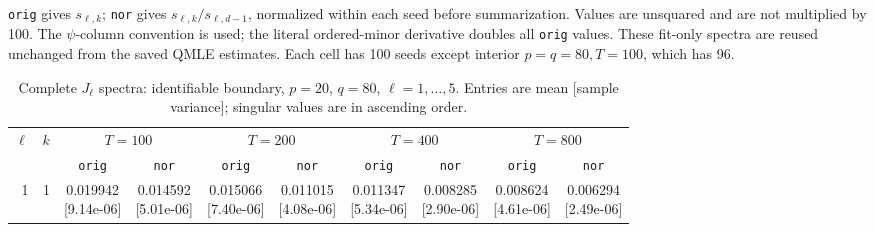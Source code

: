 \documentclass[12pt,letterpaper]{article}
\def\spacingset#1{\renewcommand{\baselinestretch}{#1}\small\normalsize}
\theoremstyle{plain}
\theoremstyle{definition}
\begin{document}
\begin{table}[p]
\begin{adjustbox}{max width=\linewidth}
\begin{tabular}{@{}rr*{8}{c}@{}}
\bottomrule
\end{tabular}
\end{adjustbox}
\par\smallskip
\begin{minipage}{0.98\linewidth}\footnotesize
\texttt{orig} gives $s_{\ell,k}$; \texttt{nor} gives $s_{\ell,k}/s_{\ell,d-1}$, normalized within each seed before summarization. Values are unsquared and are not multiplied by 100. The $\psi$-column convention is used; the literal ordered-minor derivative doubles all \texttt{orig} values. These fit-only spectra are reused unchanged from the saved QMLE estimates. Each cell has 100 seeds except interior $p=q=80,T=100$, which has 96.
\end{minipage}
\endgroup
\end{table}
\clearpage
\begin{table}[p]
\begingroup
\spacingset{1.0}
\small\centering
\caption{Complete $J_\ell$ spectra: identifiable boundary, $p=20$, $q=80$, $\ell=1,\ldots,5$. Entries are mean [sample variance]; singular values are in ascending order.}
\label{s23:lambda:alltab:spectra:p20q80boundary:1-5}
\footnotesize
\setlength{\tabcolsep}{2.2pt}
\renewcommand{\arraystretch}{1.03}
\begin{adjustbox}{max width=\linewidth}
\begin{tabular}{@{}rr*{8}{c}@{}}
\toprule
$\ell$ & $k$ & \multicolumn{2}{c}{$T=100$} & \multicolumn{2}{c}{$T=200$} & \multicolumn{2}{c}{$T=400$} & \multicolumn{2}{c}{$T=800$}\\
\cmidrule(lr){3-4}\cmidrule(lr){5-6}\cmidrule(lr){7-8}\cmidrule(lr){9-10}
 &  & \texttt{orig} & \texttt{nor} & \texttt{orig} & \texttt{nor} & \texttt{orig} & \texttt{nor} & \texttt{orig} & \texttt{nor}\\
\midrule
1 & 1 & \shortstack{0.019942\\[-1pt]{\scriptsize[9.14e-06]}} & \shortstack{0.014592\\[-1pt]{\scriptsize[5.01e-06]}} & \shortstack{0.015066\\[-1pt]{\scriptsize[7.40e-06]}} & \shortstack{0.011015\\[-1pt]{\scriptsize[4.08e-06]}} & \shortstack{0.011347\\[-1pt]{\scriptsize[5.34e-06]}} & \shortstack{0.008285\\[-1pt]{\scriptsize[2.90e-06]}} & \shortstack{0.008624\\[-1pt]{\scriptsize[4.61e-06]}} & \shortstack{0.006294\\[-1pt]{\scriptsize[2.49e-06]}}\\

\end{tabular}
\end{adjustbox}
\end{table}
\end{document}
